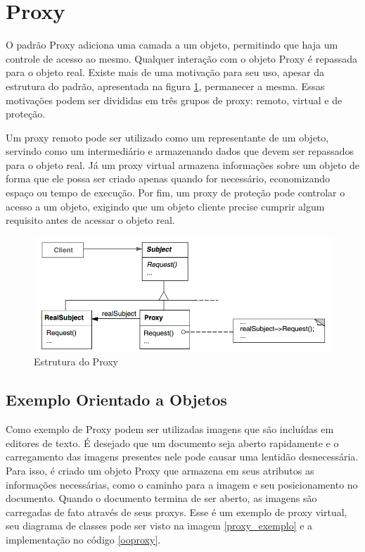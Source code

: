 \section{Proxy}

O padrão Proxy adiciona uma camada a um 
objeto, permitindo que haja um controle de 
acesso ao mesmo. Qualquer interação com o 
objeto Proxy é repassada para o objeto 
real. Existe mais de uma motivação 
para seu uso, apesar da estrutura do padrão, 
apresentada na figura \ref{proxy_struct},  
permanecer a mesma. Essas motivações 
podem ser divididas em três grupos de 
proxy: remoto, virtual e de proteção. 

Um proxy remoto pode ser utilizado como um 
representante de um objeto, servindo como um 
intermediário e armazenando dados que devem 
ser repassados para o objeto real. Já um 
proxy virtual armazena informações sobre 
um objeto de forma que ele possa ser criado 
apenas quando for necessário, economizando 
espaço ou tempo de execução. Por fim, um 
proxy de proteção pode controlar o acesso 
a um objeto, exigindo que um objeto cliente 
precise cumprir algum requisito antes de 
acessar o objeto real. 

\begin{figure}[htb]
	\caption{\label{proxy_struct}Estrutura do Proxy}
	\begin{center}
	    \includegraphics[scale=0.5]{5_padroes-contexto-funcional/5.2_estruturais/5.2.7_proxy/diagram.png}
	\end{center}
\end{figure}

\subsection*{Exemplo Orientado a Objetos}

Como exemplo de Proxy podem ser utilizadas 
imagens que são incluídas em editores de 
texto. É desejado que um documento seja aberto 
rapidamente e o carregamento das imagens 
presentes nele pode causar uma lentidão 
desnecessária. Para isso, é criado um objeto 
Proxy que armazena em seus atributos as 
informações necessárias, como o caminho 
para a imagem e seu posicionamento no 
documento. Quando o documento termina de 
ser aberto, as imagens são carregadas de 
fato através de seus proxys. Esse é um 
exemplo de proxy virtual, seu diagrama de 
classes pode ser visto na imagem \ref{proxy_exemplo} 
e a implementação no código \ref{ooproxy}.

